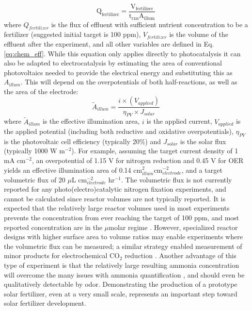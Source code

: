 \begin{equation}
\mathrm{
Q_{fertilizer} = \frac{V_{fertilizer}}{t_{rxn} A_{illum}}
}
\label{eq:flux}
\end{equation}
where $Q_{fertilizer}$ is the flux of effluent with sufficient nutrient concentration to be a fertilizer (suggested initial target is 100 ppm), $V_{fertilizer}$ is the volume of the effluent after the experiment, and all other variables are defined in Eq. \ref{eq:chem_eff}. While this equation only applies directly to photocatalysis it can also be adapted to electrocatalysis by estimating the area of conventional photovoltaics needed to provide the electrical energy and substituting this as $A_{illum}$. This will depend on the overpotentials of both half-reactions, as well as the area of the electrode:
\begin{equation}
    \tilde{A}_{illum} = \frac{i \times (V_{applied})}{\eta_{PV} \times J_{solar}}
\end{equation}
where $\tilde{A}_{illum}$ is the effective illumination area, $i$ is the applied current, $V_{applied}$ is the applied potential (including both reductive and oxidative overpotentials), $\eta_{PV}$ is the photovoltaic cell efficiency (typically 20\%) and $J_{solar}$ is the solar flux (typically 1000 W m$^{-2}$). For example, assuming the target current density of 1 mA cm$^{-2}$, an overpotential of 1.15 V for nitrogen reduction \cite{Song_2018} and 0.45 V for OER yields an effective illumination area of 0.14 cm$^2_{illum}$cm$^{-2}_{electrode}$, and a target volumetric flux of 20 $\mu$L cm$^{-2}_{electrode}$ hr$^{-1}$. The volumetric flux is not currently reported for any photo(electro)catalytic nitrogen fixation experiments, and cannot be calculated since reactor volumes are not typically reported. It is expected that the relatively large reactor volumes used in most experiments prevents the concentration from ever reaching the target of 100 ppm, and most reported concentration are in the $\mu$molar regime \cite{Hirakawa_2017,Medford_2017}. However, specialized reactor designs with higher surface area to volume ratios may enable experiments where the volumetric flux can be measured; a similar strategy enabled measurement of minor products for electrochemical CO$_2$ reduction \cite{Kuhl_2012}. Another advantage of this type of experiment is that the relatively large resulting ammonia concentration will overcome the many issues with ammonia quantification \cite{Greenlee_2018,Gao_2018,Zhao_2019,Cui_2018,Suryanto_2019}, and should even be qualitatively detectable by odor. Demonstrating the production of a prototype solar fertilizer, even at a very small scale, represents an important step toward solar fertilizer development.

